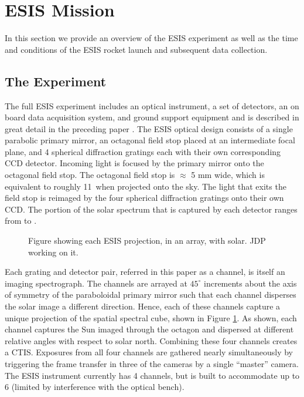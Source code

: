 \section{ESIS Mission}

In this section we provide an overview of the ESIS experiment as well as the time and conditions of the ESIS rocket launch and subsequent data collection.   

	\subsection{The Experiment}
	  	
    	The full ESIS experiment includes an optical instrument, a set of detectors, an on board data acquisition system, and ground support equipment and is described in great detail in the preceding paper \citep{ESIS}.
    	The ESIS optical design consists of a single parabolic primary mirror, an octagonal field stop placed at an intermediate focal plane, and 4 spherical diffraction gratings each with their own corresponding CCD detector.
    	Incoming light is focused by the primary mirror onto the octagonal field stop. 
    	The octagonal field stop is $\approx$ 5 mm wide, which is equivalent to roughly 11\arcmin \  when projected onto the sky. 
    	The light that exits the field stop is reimaged  by the four spherical diffraction gratings onto their own CCD.
    	The portion of the solar spectrum that is captured by each detector ranges from \hei to \ov.
    	
        \begin{figure}[ht]
			\begin{center}
				\caption{Figure showing each ESIS projection, in an array, with solar.  JDP working on it.}
				\label{fig:level_1_array}
			\end{center}
		\end{figure}

    	
    	
    	Each grating and detector pair, referred in this paper as a channel, is itself an imaging spectrograph.  
    	The channels are arrayed at $45^{\circ}$ increments about the axis of symmetry of the paraboloidal primary mirror such that each channel disperses the solar image a different direction. 
    	Hence, each of these channels capture a unique projection of the spatial spectral cube, shown in Figure \ref{fig:level_1_array}. 
    	As shown, each channel captures the Sun imaged through the octagon and dispersed at different relative angles with respect to solar north. Combining these four channels creates a CTIS. Exposures from all four channels are gathered nearly simultaneously by triggering the frame transfer in three of the cameras by a single ``master'' camera. 
    	The ESIS instrument currently has 4 channels, but is built to accommodate up to 6 (limited by interference with the optical bench).

